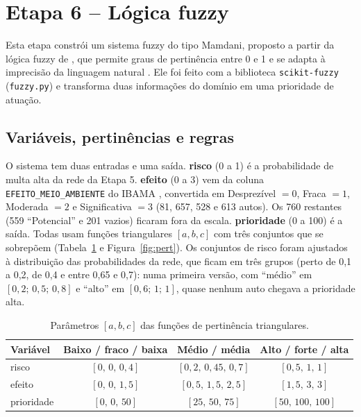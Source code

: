 \documentclass[11pt]{article}
\begin{document}
\section{Etapa 6 -- Lógica fuzzy}
Esta etapa constrói um sistema fuzzy do tipo Mamdani, proposto a partir da lógica fuzzy de , que permite graus de pertinência entre 0 e 1 e se adapta à imprecisão da linguagem natural \cite{hullermeier2011}. Ele foi feito com a biblioteca \texttt{scikit-fuzzy} (\texttt{fuzzy.py}) e transforma duas informações do domínio em uma prioridade de atuação.

\subsection{Variáveis, pertinências e regras}
O sistema tem duas entradas e uma saída. \textbf{risco} (0 a 1) é a probabilidade de multa alta da rede da Etapa 5. \textbf{efeito} (0 a 3) vem da coluna \texttt{EFEITO\_\allowbreak MEIO\_\allowbreak AMBIENTE} do IBAMA \cite{ibama2021}, convertida em Desprezível $=0$, Fraca $=1$, Moderada $=2$ e Significativa $=3$ (81, 657, 528 e 613 autos). Os 760 restantes (559 ``Potencial'' e 201 vazios) ficaram fora da escala. \textbf{prioridade} (0 a 100) é a saída. Todas usam funções triangulares $[a,b,c]$ com três conjuntos que se sobrepõem (Tabela~\ref{tab:pertinencia} e Figura~\ref{fig:pert}). Os conjuntos de risco foram ajustados à distribuição das probabilidades da rede, que ficam em três grupos (perto de 0,1 a 0,2, de 0,4 e entre 0,65 e 0,7): numa primeira versão, com ``médio'' em $[0{,}2;\,0{,}5;\,0{,}8]$ e ``alto'' em $[0{,}6;\,1;\,1]$, quase nenhum auto chegava a prioridade alta.

\begin{table}[H]
\centering
\small
\begin{tabular}{lccc}
\toprule
Variável & Baixo / fraco / baixa & Médio / média & Alto / forte / alta \\
\midrule
risco & $[0,\,0,\,0{,}4]$ & $[0{,}2,\,0{,}45,\,0{,}7]$ & $[0{,}5,\,1,\,1]$ \\
efeito & $[0,\,0,\,1{,}5]$ & $[0{,}5,\,1{,}5,\,2{,}5]$ & $[1{,}5,\,3,\,3]$ \\
prioridade & $[0,\,0,\,50]$ & $[25,\,50,\,75]$ & $[50,\,100,\,100]$ \\
\bottomrule
\end{tabular}
\caption{Parâmetros $[a,b,c]$ das funções de pertinência triangulares.}
\label{tab:pertinencia}
\end{table}
\end{document}
